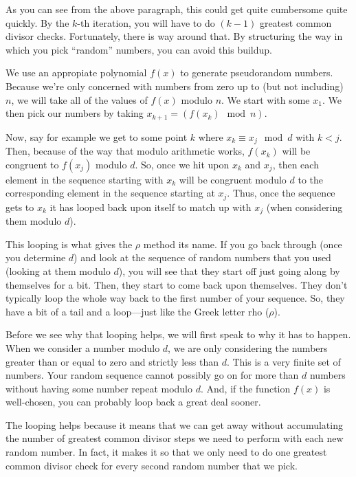 \documentclass[12pt]{article}
\begin{document}
As you can see from the above paragraph, this could get quite
cumbersome quite quickly.  By the $k$-th iteration, you will have
to do $(k-1)$ greatest common divisor checks.  Fortunately, there
is way around that.  By structuring the way in which you pick
``random'' numbers, you can avoid this buildup.

We use an appropiate polynomial $f(x)$ to generate pseudorandom numbers. Because we're only concerned with numbers from
zero up to (but not including) $n$, we will take all of the values
of $f(x)$ modulo $n$.  We start with some $x_1$.  We then pick our
numbers by taking $x_{k+1} = ( f(x_k) \mod n )$.

Now, say for example we get to some point $k$ where $x_k \equiv
x_j \mod d$ with $k < j$.  Then, because of the way that modulo
arithmetic works, $f(x_k)$ will be congruent to $f(x_j)$ modulo
$d$.  So, once we hit upon $x_k$ and $x_j$, then each element in
the sequence starting with $x_k$ will be congruent modulo $d$ to
the corresponding element in the sequence starting at $x_j$.  Thus,
once the sequence gets to $x_k$ it has looped back upon itself to
match up with $x_j$ (when considering them modulo $d$).

This looping is what gives the $\rho$ method its name.  If you go back
through (once you determine $d$) and look at the sequence of random
numbers that you used (looking at them modulo $d$), you will see
that they start off just going along by themselves for a bit.
Then, they start to come back upon themselves.  They don't typically
loop the whole way back to the first number of your sequence.  So,
they have a bit of a tail and a loop---just like the Greek letter
rho ($\rho$).

Before we see why that looping helps, we will first speak to why
it has to happen.  When we consider a number modulo $d$, we are
only considering the numbers greater than or equal to zero and
strictly less than $d$.  This is a very finite set of numbers.
Your random sequence cannot possibly go on for more than $d$ numbers
without having some number repeat modulo $d$.  And, if the function
$f(x)$ is well-chosen, you can probably loop back a great deal
sooner.

The looping helps because it means that we can get away without
accumulating the number of greatest common divisor steps we need
to perform with each new random number.  In fact, it makes it so
that we only need to do one greatest common divisor check for every
second random number that we pick.
\end{document}
